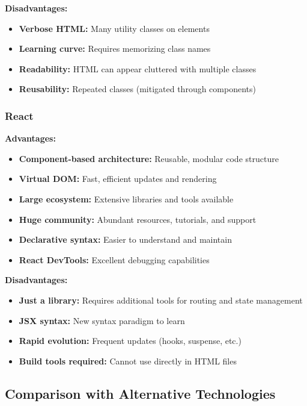 \textbf{Disadvantages:}
\begin{itemize}
    \item \textbf{Verbose HTML:} Many utility classes on elements
    \item \textbf{Learning curve:} Requires memorizing class names
    \item \textbf{Readability:} HTML can appear cluttered with multiple classes
    \item \textbf{Reusability:} Repeated classes (mitigated through components)
\end{itemize}

\subsubsection{React}

\textbf{Advantages:}
\begin{itemize}
    \item \textbf{Component-based architecture:} Reusable, modular code structure
    \item \textbf{Virtual DOM:} Fast, efficient updates and rendering
    \item \textbf{Large ecosystem:} Extensive libraries and tools available
    \item \textbf{Huge community:} Abundant resources, tutorials, and support
    \item \textbf{Declarative syntax:} Easier to understand and maintain
    \item \textbf{React DevTools:} Excellent debugging capabilities
\end{itemize}

\textbf{Disadvantages:}
\begin{itemize}
    \item \textbf{Just a library:} Requires additional tools for routing and state management
    \item \textbf{JSX syntax:} New syntax paradigm to learn
    \item \textbf{Rapid evolution:} Frequent updates (hooks, suspense, etc.)
    \item \textbf{Build tools required:} Cannot use directly in HTML files
\end{itemize}

\subsection{Comparison with Alternative Technologies}

